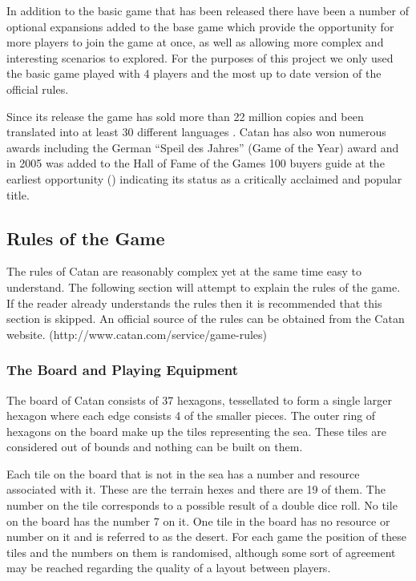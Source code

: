 \documentclass[]{article}
\begin{document}
\par In addition to the basic game that has been released there have been a number of optional expansions added to the base game which provide the opportunity for more players to join the game at once, as well as allowing more complex and interesting scenarios to explored. For the purposes of this project we only used the basic game played with 4 players and the most up to date version of the official rules.

\par Since its release the game has sold more than 22 million copies and been translated into at least 30 different languages \autocite{variety2015}. Catan has also won numerous awards including the German ``Speil des Jahres'' (Game of the Year) award and in 2005 was added to the Hall of Fame of the Games 100 buyers guide at the earliest opportunity (\citeauthor{spielDesJahr}) indicating its status as a critically acclaimed and popular title.

\subsection{Rules of the Game}
The rules of Catan are reasonably complex yet at the same time easy to understand. The following section will attempt to explain the rules of the game. If the reader already understands the rules then it is recommended that this section is skipped. An official source of the rules can be obtained from the Catan website. (http://www.catan.com/service/game-rules)

\subsubsection{The Board and Playing Equipment}
The board of Catan consists of 37 hexagons, tessellated to form a single larger hexagon where each edge consists 4 of the smaller pieces. The outer ring of hexagons on the board make up the tiles representing the sea. These tiles are considered out of bounds and nothing can be built on them.

\par Each tile on the board that is not in the sea has a number and resource associated with it. These are the terrain hexes and there are 19 of them. The number on the tile corresponds to a possible result of a double dice roll. No tile on the board has the number 7 on it. One tile in the board has no resource or number on it and is referred to as the desert. For each game the position of these tiles and the numbers on them is randomised, although some sort of agreement may be reached regarding the quality of a layout between players.
\end{document}
